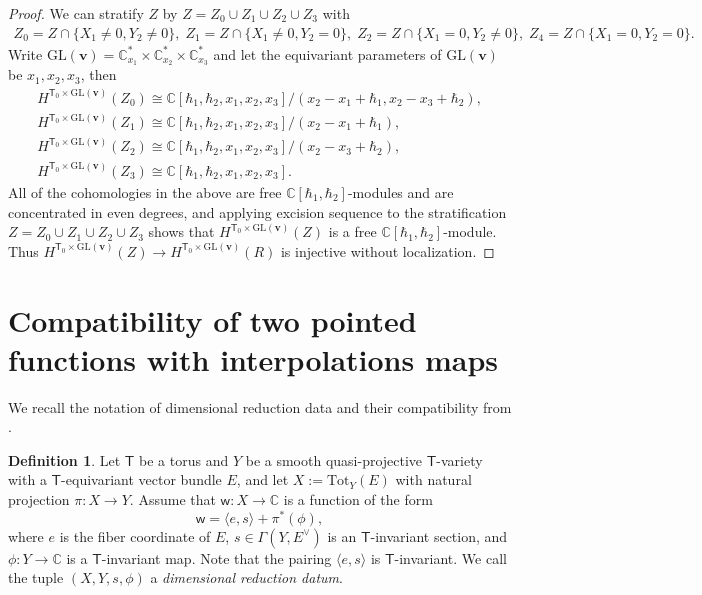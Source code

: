 \documentclass[10pt]{amsart}
\theoremstyle{definition}
\newtheorem{Definition}[Theorem]{Definition}
\numberwithin{equation}{section}
\newcommand{\GL}{\mathrm{GL}}
\newcommand{\bC}{\mathbb{C}}
\newcommand{\bv}{\mathbf{v}}
\newcommand{\sT}{\mathsf{T}}
\newcommand{\sw}{\mathsf{w}}
\begin{document}
\begin{proof}
We can stratify $Z$ by $Z=Z_0\cup Z_1\cup Z_2\cup Z_3$ with 
\begin{align*}
    Z_0=Z\cap \{X_1\neq 0, Y_2\neq 0\},\; Z_1=Z\cap \{X_1\neq 0, Y_2=0\},\; Z_2=Z\cap \{X_1=0, Y_2\neq 0\},\; Z_4=Z\cap \{X_1=0, Y_2=0\}.
\end{align*}
Write $\GL(\bv)=\bC^*_{x_1}\times \bC^*_{x_2}\times \bC^*_{x_3}$ and let the equivariant parameters of $\GL(\bv)$ be $x_1,x_2,x_3$, then
\begin{gather*}
H^{\sT_0\times \GL(\bv)}(Z_0)\cong\bC[\hbar_1,\hbar_2,x_1,x_2,x_3]/(x_2-x_1+\hbar_1, x_2-x_3+\hbar_2),\\
H^{\sT_0\times \GL(\bv)}(Z_1)\cong\bC[\hbar_1,\hbar_2,x_1,x_2,x_3]/(x_2-x_1+\hbar_1),\\
H^{\sT_0\times \GL(\bv)}(Z_2)\cong\bC[\hbar_1,\hbar_2,x_1,x_2,x_3]/(x_2-x_3+\hbar_2),\\
H^{\sT_0\times \GL(\bv)}(Z_3)\cong\bC[\hbar_1,\hbar_2,x_1,x_2,x_3].
\end{gather*}
All of the cohomologies in the above are free $\bC[\hbar_1,\hbar_2]$-modules and are concentrated in even degrees, and applying excision sequence to the stratification $Z=Z_0\cup Z_1\cup Z_2\cup Z_3$ shows that $H^{\sT_0\times \GL(\bv)}(Z)$ is a free $\bC[\hbar_1,\hbar_2]$-module. Thus $H^{\sT_0\times \GL(\bv)}(Z)\to H^{\sT_0\times \GL(\bv)}(R)$ is injective without localization.
\end{proof}

\iffalse

\section{Compatibility of two pointed functions with interpolations maps}

We recall the notation of dimensional reduction data and their compatibility from \cite[\S 6.1]{COZZ}.
\begin{Definition}
Let $\sT$ be a torus and $Y$ be a smooth quasi-projective $\sT$-variety with a $\sT$-equivariant vector bundle $E$, and let $X:=\mathrm{Tot}_Y(E)$ with natural projection $\pi\colon X\to Y$. Assume that $\sw\colon X\to \bC$ is a function of the form $$\sw=\langle e,s\rangle+\pi^*(\phi),$$ where $e$ is the fiber coordinate of $E$, $s\in \Gamma(Y,E^\vee)$ is an 
$\sT$-invariant section, and $\phi\colon Y\to \bC$ is a $\sT$-invariant map. Note that the pairing $\langle e,s\rangle$ is $\sT$-invariant. We call the tuple $(X,Y,s,\phi)$ a \textit{dimensional reduction datum}. 
\end{Definition}
\end{document}
